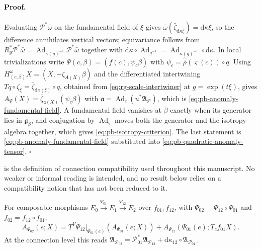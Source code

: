 \paragraph{Proof.}
Evaluating $\mathcal P^*\bar\omega$ on the fundamental field of $\xi$ gives
$\bar\omega(\bar\zeta_{\mathrm d\kappa\xi})=\mathrm d\kappa\xi$, so the
difference annihilates vertical vectors; equivariance follows from
$R_g^*\mathcal P^*\bar\omega
=\operatorname{Ad}_{\kappa(g)^{-1}}\mathcal P^*\bar\omega$ together with
$\mathrm d\kappa\circ\operatorname{Ad}_{g^{-1}}
=\operatorname{Ad}_{\kappa(g)^{-1}}\circ\mathrm d\kappa$.  In local
trivializations write $\Psi(c,\beta)=(f(c),\psi_c\beta)$ with
$\psi_c=\widehat{\bar\rho}(\varsigma(c))\circ q$.  Using
$H^\omega_{(c,\beta)}X=(X,-\zeta_{A(X)}\beta)$ and the differentiated
intertwining $Tq\circ\zeta_\xi=\bar\zeta_{\mathrm d\kappa(\xi)}\circ q$,
obtained from \eqref{eq:rg-scale-intertwiner} at $g=\exp(t\xi)$, gives
$A_\Psi(X)=\bar\zeta_{\mathfrak a(X)}(\psi_c\beta)$ with
$\mathfrak a=\operatorname{Ad}_\varsigma(u^*\mathfrak A_{\mathcal P})$, which is
\eqref{eq:pb-anomaly-fundamental-field}.  A fundamental field vanishes at
$\bar\beta$ exactly when its generator lies in $\bar{\mathfrak g}_{\bar\beta}$,
and conjugation by $\operatorname{Ad}_\varsigma$ moves both the generator and
the isotropy algebra together, which gives
\eqref{eq:pb-isotropy-criterion}.  The last statement is
\eqref{eq:pb-anomaly-fundamental-field} substituted into
\eqref{eq:pb-quadratic-anomaly-tensor}.  $\square$

 is the definition of connection compatibility
used throughout this manuscript.  No weaker or informal reading is intended,
and no result below relies on a compatibility notion that has not been reduced
to it.  

For composable morphisms
$E_0\xrightarrow{\Psi_{01}}E_1\xrightarrow{\Psi_{12}}E_2$ over
$f_{01},f_{12}$, with $\Psi_{02}=\Psi_{12}\circ\Psi_{01}$ and
$f_{02}=f_{12}\circ f_{01}$,
\begin{equation}
A_{\Psi_{02}}(e;X)
=T^V\Psi_{12}\big|_{\Psi_{01}(e)}
\left(A_{\Psi_{01}}(e;X)\right)
+A_{\Psi_{12}}\left(\Psi_{01}(e);T_cf_{01}X\right).
\label{eq:pb-anomaly-composition}
\end{equation}
At the connection level this reads
$\mathfrak A_{\mathcal P_{02}}
=\mathcal P_{01}^*\mathfrak A_{\mathcal P_{12}}
+\mathrm d\kappa_{12}\circ\mathfrak A_{\mathcal P_{01}}$.

